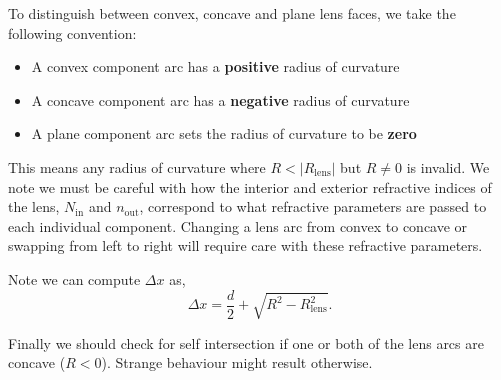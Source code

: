 \documentclass{article}
\begin{document}
To distinguish between convex, concave and plane lens faces, we take the following convention:
\begin{itemize}
    \item A convex component arc has a \textbf{positive} radius of curvature
    \item A concave component arc has a \textbf{negative} radius of curvature
    \item A plane component arc sets the radius of curvature to be \textbf{zero}
\end{itemize}
This means any radius of curvature where $R < |R_\mathrm{lens}|$ but $R \neq 0$ is invalid. We note we must be careful with how the interior and exterior refractive indices of the lens, $N_\mathrm{in}$ and $n_\mathrm{out}$, correspond to what refractive parameters are passed to each individual component. Changing
a lens arc from convex to concave or swapping from left to right will require care with these refractive parameters.

Note we can compute $\Delta x$ as,
\begin{equation}
    \Delta x = \frac{d}{2} + \sqrt{R^2 - R_\mathrm{lens}^2}.
\end{equation}

Finally we should check for self intersection if one or both of the lens arcs are concave ($R<0$). Strange behaviour might result otherwise.
\end{document}

